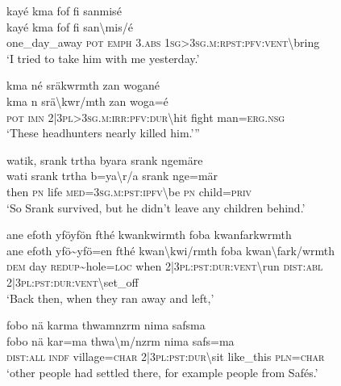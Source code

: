 \ea\label{ex:4:a1710}
kayé kma fof fi sanmisé\\
\gll kayé	kma	fof	fi	san{\textbackslash}mis/é\\
     one\_day\_away	\textsc{pot}	\textsc{emph}	3.\textsc{abs}	1\textsc{sg}>3\textsc{sg}.\textsc{m}:\textsc{rpst}:\textsc{pfv}:\textsc{vent}{\textbackslash}bring\\
\glt `I tried to take him with me yesterday.'
\z

\ea\label{ex:4:a1711}
kma né sräkwrmth zan wogané\\
\gll kma	n	srä{\textbackslash}kwr/mth	zan	woga=é\\
     \textsc{pot}	\textsc{imn}	2|3\textsc{pl}>3\textsc{sg}.\textsc{m}:\textsc{irr}:\textsc{pfv}:\textsc{dur}{\textbackslash}hit	fight	man=\textsc{erg}.\textsc{nsg}\\
\glt `These headhunters nearly killed him.'''
\z

\ea\label{ex:4:a1712}
watik, srank trtha byara srank ngemäre\\
\gll wati	srank	trtha	b=ya{\textbackslash}r/a	srank	nge=mär\\
     then	\textsc{pn}	life	\textsc{med}=3\textsc{sg}.\textsc{m}:\textsc{pst}:\textsc{ipfv}{\textbackslash}be	\textsc{pn}	child=\textsc{priv}\\
\glt `So Srank survived, but he didn't leave any children behind.'
\z

\newpage
\ea\label{ex:4:a1713}
ane efoth yföyfön fthé kwankwirmth foba kwanfarkwrmth\\
\gll ane	efoth	yfö{\textasciitilde}yfö=en	fthé	kwan{\textbackslash}kwi/rmth	foba	kwan{\textbackslash}fark/wrmth\\
     \textsc{dem}	day	\textsc{redup}{\textasciitilde}hole=\textsc{loc}	when	2|3\textsc{pl}:\textsc{pst}:\textsc{dur}:\textsc{vent}{\textbackslash}run	\textsc{dist}:\textsc{abl}	2|3\textsc{pl}:\textsc{pst}:\textsc{dur}:\textsc{vent}{\textbackslash}set\_off\\
\glt `Back then, when they ran away and left,'
\z

\ea\label{ex:4:a1714}
fobo nä karma thwamnzrm nima safsma\\
\gll fobo	nä	kar=ma	thwa{\textbackslash}m/nzrm	nima	safs=ma\\
     \textsc{dist}:\textsc{all}	\textsc{indf}	village=\textsc{char}	2|3\textsc{pl}:\textsc{pst}:\textsc{dur}{\textbackslash}sit	like\_this	\textsc{pln}=\textsc{char}\\
\glt `other people had settled there, for example people from Safés.'
\z

